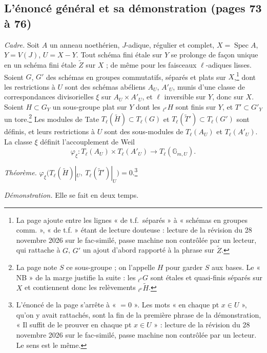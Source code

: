 \documentclass[11pt,a4paper]{article}
\begin{document}
\subsection*{L'énoncé général et sa démonstration (pages 73 à 76)}

\emph{Cadre.} Soit $A$ un anneau noethérien, $J$-adique, régulier et complet,
$X = \operatorname{Spec}A$, $Y = V(J)$, $U = X - Y$. Tout schéma fini étale sur
$Y$ se prolonge de façon unique en un schéma fini étale $\tilde Z$ sur $X$ ; de
même pour les faisceaux $\ell$-adiques lisses. Soient $G$, $G'$ des schémas en
groupes commutatifs, séparés et plats sur $X$,\footnote{La page ajoute entre
les lignes « de t.f.\ séparés » à « schémas en groupes comm. », « de t.f. »
étant de lecture douteuse : lecture de la révision du 28 novembre 2026 sur le
fac-similé, passe machine non contrôlée par un lecteur, qui rattache à $G$,
$G'$ un ajout d'abord rapporté à la phrase sur $\tilde Z$.} dont les restrictions à $U$ sont des schémas
abéliens $A_U$, $A'_U$, munis d'une classe de correspondances divisorielles
$\xi$ sur $A_U \times A'_U$, et $\ell$ inversible sur $Y$, donc sur $X$. Soient
$H \subset G_Y$ un sous-groupe plat sur $Y$ dont les ${}_{\ell^\nu}H$ sont finis
sur $Y$, et $T' \subset G'_Y$ un tore.\footnote{La page note $S$ ce sous-groupe ;
on l'appelle $H$ pour garder $S$ aux bases. Le « NB » de la marge justifie la
suite : les ${}_{\ell^\nu}G$ sont étales et quasi-finis séparés sur $X$ et
contiennent donc les relèvements ${}_{\ell^\nu}\tilde H$.} Les modules de Tate
$T_\ell(\tilde H) \subset T_\ell(G)$ et $T_\ell(\tilde T') \subset T_\ell(G')$
sont définis, et leurs restrictions à $U$ sont des sous-modules de $T_\ell(A_U)$
et $T_\ell(A'_U)$. La classe $\xi$ définit l'accouplement de Weil
\[ \varphi_\xi\colon T_\ell(A_U) \times T_\ell(A'_U) \to
T_\ell(\mathbb{G}_{m,U}) . \]

\emph{Théorème.} $\varphi_\xi\bigl(T_\ell(\tilde H)|_U,\ T_\ell(\tilde
T')|_U\bigr) = 0$.\footnote{L'énoncé de la page s'arrête à « $= 0$ ». Les mots
« en chaque pt $x \in U$ », qu'on y avait rattachés, sont la fin de la première
phrase de la démonstration, « Il suffit de le prouver en chaque pt
$x \in U$ » : lecture de la révision du 28 novembre 2026 sur le fac-similé,
passe machine non contrôlée par un lecteur. Le sens est le même.}

\emph{Démonstration.} Elle se fait en deux temps.
\end{document}
